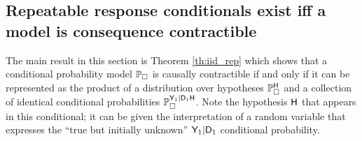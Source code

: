 






\subsection{Repeatable response conditionals exist iff a model is consequence contractible}

The main result in this section is Theorem \ref{th:iid_rep} which shows that a conditional probability model $\mathbb{P}_\square$ is causally contractible if and only if it can be represented as the product of a distribution over hypotheses $\mathbb{P}_\square^{\mathsf{H}}$ and a collection of identical conditional probabilities $\mathbb{P}_\square^{\mathsf{Y}_1|\mathsf{D}_1\mathsf{H}}$. Note the hypothesis $\mathsf{H}$ that appears in this conditional; it can be given the interpretation of a random variable that expresses the ``true but initially unknown'' $\mathsf{Y}_1|\mathsf{D}_1$ conditional probability.

